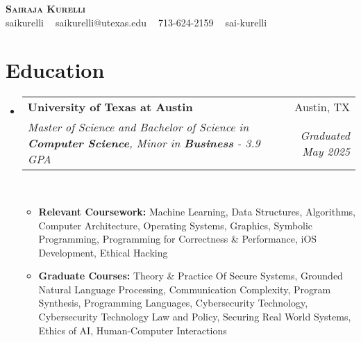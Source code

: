 \documentclass[letterpaper,11pt]{article}
\makeatletter
\newcommand{\resumeItem}[1]{
  \item\small{
    {#1 \vspace{-2pt}}
  }
}
\newcommand{\resumeSubLineheading}[6]{
  \vspace{-2pt}\item
    \begin{tabular*}{0.97\textwidth}[t]{l@{\extracolsep{\fill}}r}
      \textbf{#1} & #2 \\
      \textit{\small#3} & \textit{\small #5} \\
    \end{tabular*}\vspace{-7pt}
}
\newcommand{\resumeSubHeadingListStart}{\begin{itemize}[leftmargin=0.15in, label={}]}
\newcommand{\resumeSubHeadingListEnd}{\end{itemize}}
\newcommand{\resumeItemListStart}{\begin{itemize}}
\newcommand{\resumeItemListEnd}{\end{itemize}\vspace{-5pt}}
\makeatother
\begin{document}

\begin{center}
  \textbf{\huge \scshape Sairaja Kurelli} \\ \vspace{3pt}
  \small \faGithub{} saikurelli $\;\;$ \faEnvelope{} saikurelli@utexas.edu $\;\;$ \faPhone{} 713-624-2159 $\;\;$\faLinkedin{} sai-kurelli
\end{center}


\section{Education}
\resumeSubHeadingListStart
\resumeSubLineheading
{University of Texas at Austin}{Austin, TX}
{Master of Science and Bachelor of Science in \textbf{Computer Science}, Minor in \textbf{Business} - 3.9 GPA}
{}{Graduated May 2025} {}
\\
\resumeItemListStart
\resumeItem{\small \textbf{Relevant Coursework:} Machine Learning, Data Structures, Algorithms,
  Computer Architecture, Operating Systems, Graphics, Symbolic Programming, Programming for Correctness \& Performance,
  iOS Development, Ethical Hacking} %
\resumeItem{\small \textbf{Graduate Courses:} Theory \& Practice Of Secure Systems, Grounded Natural Language Processing, Communication Complexity, Program Synthesis, Programming Languages, Cybersecurity Technology, Cybersecurity Technology Law and Policy, Securing Real World Systems, Ethics of AI, Human-Computer Interactions}
\resumeItemListEnd
\resumeSubHeadingListEnd
\end{document}
